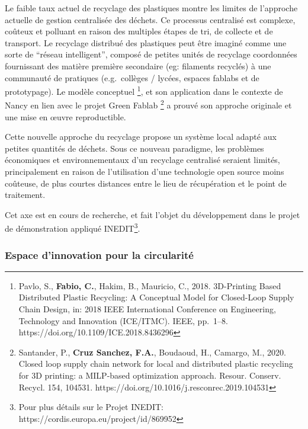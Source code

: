 \documentclass[
  11pt,
]{article}
\begin{document}
Le faible taux actuel de recyclage des plastiques montre les limites de
l'approche actuelle de gestion centralisée des déchets. Ce processus
centralisé est complexe, coûteux et polluant en raison des multiples
étapes de tri, de collecte et de transport. Le recyclage distribué des
plastiques peut être imaginé comme une sorte de ``réseau intelligent'',
composé de petites unités de recyclage coordonnées fournissant des
matière première secondaire (eg: filaments recyclés) à une communauté de
pratiques (e.g.~collèges / lycées, espaces fablabs et de prototypage).
Le modèle conceptuel \footnote{Pavlo, S., \textbf{Fabio, C.}, Hakim, B.,
  Mauricio, C., 2018. 3D-Printing Based Distributed Plastic Recycling: A
  Conceptual Model for Closed-Loop Supply Chain Design, in: 2018 IEEE
  International Conference on Engineering, Technology and Innovation
  (ICE/ITMC). IEEE, pp.~1--8. https://doi.org/10.1109/ICE.2018.8436296},
et son application dans le contexte de Nancy en lien avec le projet
Green Fablab \footnote{Santander, P., \textbf{Cruz Sanchez, F.A.},
  Boudaoud, H., Camargo, M., 2020. Closed loop supply chain network for
  local and distributed plastic recycling for 3D printing: a MILP-based
  optimization approach. Resour. Conserv. Recycl. 154, 104531.
  https://doi.org/10.1016/j.resconrec.2019.104531} a prouvé son approche
originale et une mise en œuvre reproductible.

Cette nouvelle approche du recyclage propose un système local adapté aux
petites quantités de déchets. Sous ce nouveau paradigme, les problèmes
économiques et environnementaux d'un recyclage centralisé seraient
limités, principalement en raison de l'utilisation d'une technologie
open source moins coûteuse, de plus courtes distances entre le lieu de
récupération et le point de traitement.

Cet axe est en cours de recherche, et fait l'objet du développement dans
le projet de démonstration appliqué INEDIT\footnote{Pour plus détails
  sur le Projet INEDIT: https://cordis.europa.eu/project/id/869952}.

\hypertarget{espace-dinnovation-pour-la-circularituxe9}{%
\subsubsection{Espace d'innovation pour la
circularité}\label{espace-dinnovation-pour-la-circularituxe9}}
\end{document}
